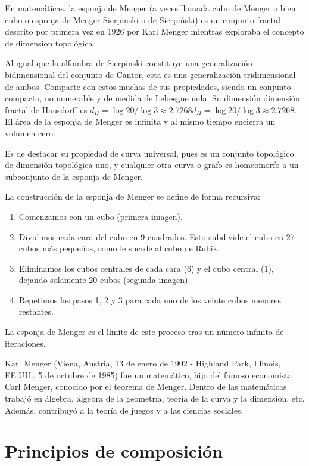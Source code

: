 \documentclass[a4paper]{book}
\begin{document}
En matemáticas, la esponja de Menger (a veces llamada cubo de Menger o bien cubo o esponja de Menger-Sierpinski o de Sierpiński) es un conjunto fractal descrito por primera vez en 1926 por Karl Menger mientras exploraba el concepto de dimensión topológica

Al igual que la alfombra de Sierpinski constituye una generalización bidimensional del conjunto de Cantor, esta es una generalización tridimensional de ambos. Comparte con estos muchas de sus propiedades, siendo un conjunto compacto, no numerable y de medida de Lebesgue nula. Su dimensión dimensión fractal de Hausdorff es ${ d_{H}=\log 20/\log 3\approx 2.7268}d_{H}=\log 20/\log 3\approx 2.7268$. El área de la esponja de Menger es infinita y al mismo tiempo encierra un volumen cero.




Es de destacar su propiedad de curva universal, pues es un conjunto topológico de dimensión topológica uno, y cualquier otra curva o grafo es homeomorfo a un subconjunto de la esponja de Menger.


La construcción de la esponja de Menger se define de forma recursiva:

\begin{enumerate}
	\item Comenzamos con un cubo (primera imagen).
	\item Dividimos cada cara del cubo en 9 cuadrados. Esto subdivide el cubo en 27 cubos más pequeños, como le sucede al cubo de Rubik.
	\item Eliminamos los cubos centrales de cada cara (6) y el cubo central (1), dejando solamente 20 cubos (segunda imagen).
	\item Repetimos los pasos 1, 2 y 3 para cada uno de los veinte cubos menores restantes.
\end{enumerate}
La esponja de Menger es el límite de este proceso tras un número infinito de iteraciones.


Karl Menger (Viena, Austria, 13 de enero de 1902 - Highland Park, Illinois, EE.UU., 5 de octubre de 1985) fue un matemático, hijo del famoso economista Carl Menger, conocido por el teorema de Menger. Dentro de las matemáticas trabajó en álgebra, álgebra de la geometría, teoría de la curva y la dimensión, etc. Además, contribuyó a la teoría de juegos y a las ciencias sociales.



\chapter{Principios de composición}
\end{document}
